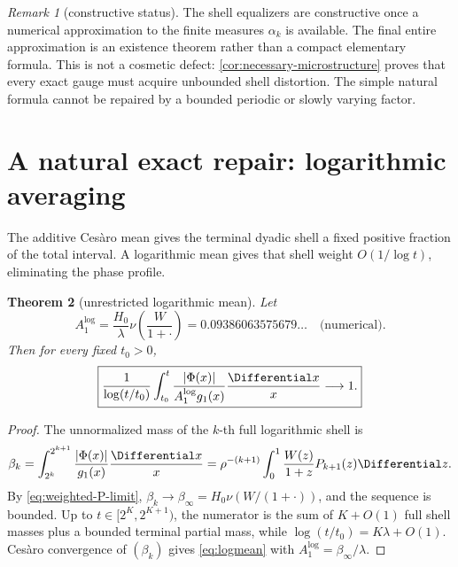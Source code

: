 \documentclass[11pt,oneside]{article}
\newtheorem{theorem}{Theorem}[section]
\theoremstyle{definition}
\theoremstyle{remark}
\newtheorem{remark}[theorem]{Remark}
\begin{document}
\begin{remark}[constructive status]
The shell equalizers are constructive once a numerical approximation to the
finite measures \(\alpha_k\) is available.  The final entire approximation is
an existence theorem rather than a compact elementary formula.  This is not a
cosmetic defect: \cref{cor:necessary-microstructure} proves that every exact
gauge must acquire unbounded shell distortion.  The simple natural formula
cannot be repaired by a bounded periodic or slowly varying factor.
\end{remark}

\section{A natural exact repair: logarithmic averaging}
\label{sec:logmean}

The additive Ces\`aro mean gives the terminal dyadic shell a fixed positive
fraction of the total interval.  A logarithmic mean gives that shell weight
\(O(1/\log t)\), eliminating the phase profile.

\begin{theorem}[unrestricted logarithmic mean]
\label{thm:logmean}
Let
\begin{equation}
 A_1^{\log}
 =\frac{H_0}{\lambda}\nu\!\left(\frac{W}{1+\cdot}\right)
 =0.09386063575679\ldots\quad\text{(numerical)}.
 \label{eq:Alog}
\end{equation}
Then for every fixed \(t_0>0\),
\begin{equation}
 \boxed{
 \frac1{\log(t/t_0)}\int_{t_0}^t
 \frac{|\Phi(x)|}{A_1^{\log}g_1(x)}\frac{\Differential x}{x}
 \longrightarrow1.}
 \label{eq:logmean}
\end{equation}
\end{theorem}

\begin{proof}
The unnormalized mass of the \(k\)-th full logarithmic shell is
\[
 \beta_k
 =\int_{2^k}^{2^{k+1}}\frac{|\Phi(x)|}{g_1(x)}\frac{\Differential x}{x}
 =\rho^{-(k+1)}\int_0^1\frac{W(z)}{1+z}P_{k+1}(z)\Differential z.
\]
By \eqref{eq:weighted-P-limit},
\(\beta_k\to\beta_\infty=H_0\nu(W/(1+\cdot))\), and the sequence is
bounded.  Up to \(t\in[2^K,2^{K+1})\), the numerator is the sum of
\(K+O(1)\) full shell masses plus a bounded terminal partial mass, while
\(\log(t/t_0)=K\lambda+O(1)\).  Ces\`aro convergence of \((\beta_k)\) gives
\eqref{eq:logmean} with \(A_1^{\log}=\beta_\infty/\lambda\).
\end{proof}
\end{document}
